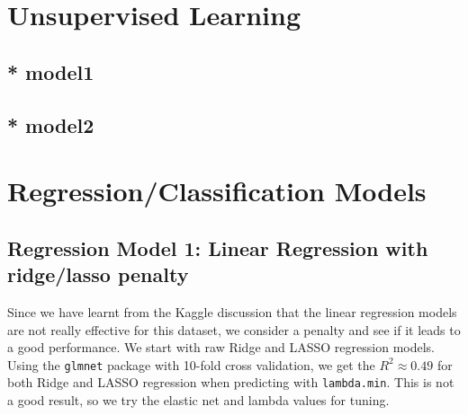 \documentclass[8pt]{article}
\begin{document}
\section{Unsupervised Learning}

\subsection{* model1}


\subsection{* model2}


\section{Regression/Classification Models}

\subsection{Regression Model 1: Linear Regression with ridge/lasso penalty}
Since we have learnt from the Kaggle discussion that the linear regression models are not really effective for this dataset, 
we consider a penalty and see if it leads to a good performance. 
We start with raw Ridge and LASSO regression models. Using the \texttt{glmnet} package with 10-fold cross validation, 
we get the $R^2 \approx 0.49$ for both Ridge and LASSO regression when predicting with \texttt{lambda.min}. 
This is not a good result, so we try the elastic net and lambda values for tuning. 
\end{document}
